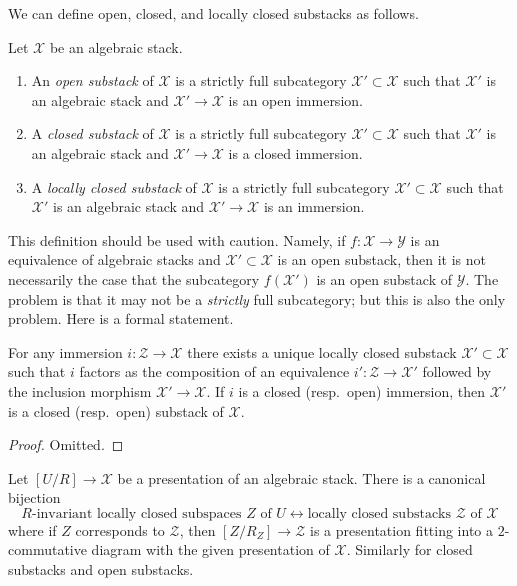 \noindent
We can define open, closed, and locally closed substacks as follows.

\begin{definition}
\label{definition-substacks}
Let $\mathcal{X}$ be an algebraic stack.
\begin{enumerate}
\item An {\it open substack} of $\mathcal{X}$ is a strictly full subcategory
$\mathcal{X}' \subset \mathcal{X}$ such that $\mathcal{X}'$ is an algebraic
stack and $\mathcal{X}' \to \mathcal{X}$ is an open immersion.
\item A {\it closed substack} of $\mathcal{X}$ is a strictly full subcategory
$\mathcal{X}' \subset \mathcal{X}$ such that $\mathcal{X}'$ is an algebraic
stack and $\mathcal{X}' \to \mathcal{X}$ is a closed immersion.
\item A {\it locally closed substack} of $\mathcal{X}$ is a strictly full
subcategory $\mathcal{X}' \subset \mathcal{X}$ such that $\mathcal{X}'$
is an algebraic stack and $\mathcal{X}' \to \mathcal{X}$ is an immersion.
\end{enumerate}
\end{definition}

\noindent
This definition should be used with caution. Namely, if
$f : \mathcal{X} \to \mathcal{Y}$ is an equivalence of algebraic stacks
and $\mathcal{X}' \subset \mathcal{X}$ is an open substack, then it
is not necessarily the case that the subcategory $f(\mathcal{X}')$
is an open substack of $\mathcal{Y}$. The problem is that it may not
be a {\it strictly} full subcategory; but this is also the only problem.
Here is a formal statement.

\begin{lemma}
\label{lemma-substack-image}
For any immersion $i : \mathcal{Z} \to \mathcal{X}$ there exists a
unique locally closed substack $\mathcal{X}' \subset \mathcal{X}$
such that $i$ factors as the composition of
an equivalence $i' : \mathcal{Z} \to \mathcal{X}'$
followed by the inclusion morphism $\mathcal{X}' \to \mathcal{X}$.
If $i$ is a closed (resp.\ open) immersion, then $\mathcal{X}'$
is a closed (resp.\ open) substack of $\mathcal{X}$.
\end{lemma}

\begin{proof}
Omitted.
\end{proof}

\begin{lemma}
\label{lemma-substacks-presentation}
Let $[U/R] \to \mathcal{X}$ be a presentation of an algebraic stack.
There is a canonical bijection
$$
R\text{-invariant locally closed subspaces }Z\text{ of }U
\leftrightarrow
\text{locally closed substacks }\mathcal{Z}\text{ of }\mathcal{X}
$$
where if $Z$ corresponds to $\mathcal{Z}$, then
$[Z/R_Z] \to \mathcal{Z}$ is a presentation fitting into a $2$-commutative
diagram with the given presentation of $\mathcal{X}$.
Similarly for closed substacks and open substacks.
\end{lemma}

